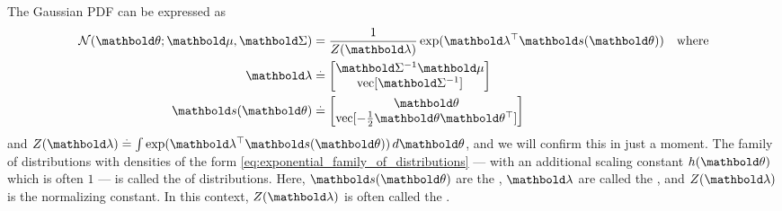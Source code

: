 The Gaussian PDF can be expressed as \begin{align}
  \N[\vtheta]{\vmu}{\mSigma} &= \frac{1}{Z(\vlambda)} \exp(\transpose{\vlambda} \vs(\vtheta)) \quad\text{where} \label{eq:exponential_family_of_distributions} \\
  \vlambda &\defeq \begin{bmatrix}
    \inv{\mSigma}\vmu \\
    \vecop{\inv{\mSigma}}
  \end{bmatrix} \label{eq:gaussian_nat_params} \\
  \vs(\vtheta) &\defeq \begin{bmatrix}
    \vtheta \\
    \vecop{-\frac{1}{2}\vtheta\transpose{\vtheta}}
  \end{bmatrix} \label{eq:gaussian_suff_stats}
\end{align} and $Z(\vlambda) \defeq \int \exp(\transpose{\vlambda} \vs(\vtheta)) \,d\vtheta$, and we will confirm this in just a moment.
The family of distributions with densities of the form \eqref{eq:exponential_family_of_distributions} --- with an additional scaling constant $h(\vtheta)$ which is often $1$ --- is called the  of distributions.
Here, $\vs(\vtheta)$ are the , $\vlambda$ are called the , and $Z(\vlambda)$ is the normalizing constant.
In this context, $Z(\vlambda)$ is often called the .

